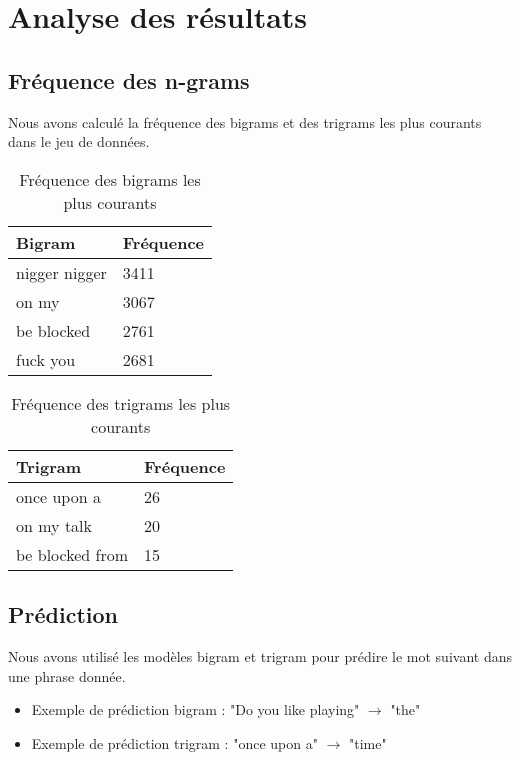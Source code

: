 \section{Analyse des résultats}

\subsection{Fréquence des n-grams}

Nous avons calculé la fréquence des bigrams et des trigrams les plus courants dans le jeu de données.

\begin{table}[h]
    \centering
    \begin{tabular}{|l|l|}
    \hline
    \textbf{Bigram} & \textbf{Fréquence} \\ \hline
    nigger nigger & 3411 \\ \hline
    on my & 3067 \\ \hline
    be blocked & 2761 \\ \hline
    fuck you & 2681 \\ \hline
    \end{tabular}
    \caption{Fréquence des bigrams les plus courants}
\end{table}

\begin{table}[h]
    \centering
    \begin{tabular}{|l|l|}
    \hline
    \textbf{Trigram} & \textbf{Fréquence} \\ \hline
    once upon a & 26 \\ \hline
    on my talk & 20 \\ \hline
    be blocked from & 15 \\ \hline
    \end{tabular}
    \caption{Fréquence des trigrams les plus courants}
\end{table}

\subsection{Prédiction}

Nous avons utilisé les modèles bigram et trigram pour prédire le mot suivant dans une phrase donnée.

\begin{itemize}
    \item Exemple de prédiction bigram : "Do you like playing" $\rightarrow$ "the"
    \item Exemple de prédiction trigram : "once upon a" $\rightarrow$ "time"
\end{itemize}

